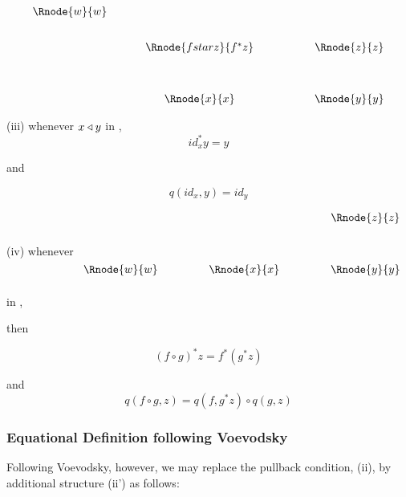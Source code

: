 \documentclass[10pt,a4paper]{article}
\begin{document}
\vspace{3mm}
\begin{center}
\begin{displaymath}
\begin{array}{cp{0.5cm}cp{1.2cm}c}
\Rnode{w}{w} &&                     &&           \\ [0.7cm]
             &&\Rnode{fstarz}{f^*z} && \Rnode{z}{z}\\ [1.2cm]
             &&\Rnode{x}{x}         && \Rnode{y}{y}
\end{array}
\end{displaymath}
\setlength{\arrnodesepA}{3pt}
\end{center}

 

\vspace {0.25cm}
\noindent (iii) whenever $x \triangleleft y$ in , 
\begin{equation}
id_x^*y=y
\end{equation}

and

\begin{equation}
q(id_x,y) = id_y
\end{equation}
\vspace{0.2cm}

\noindent (iv) whenever 
$
\begin{array}{c p{.9cm} c p{.9cm} c}
             &   &             &   & \Rnode{z}{z} \\ [1.2cm]
\Rnode{w}{w} &   &\Rnode{x}{x} &   & \Rnode{y}{y} \\ [0.5cm]
\end{array}
$
in , 

then

\begin{equation}
(f \circ g)^*z =  f^* (g ^* z)
\end{equation}

and 
\begin{equation}
q(f \circ g,z) = q(f,g^*z) \circ q(g,z)
\end{equation}


\subsubsection{Equational Definition following Voevodsky}
Following Voevodsky, however, we may replace the pullback condition, (ii), by additional structure (ii') as follows:
\end{document}
